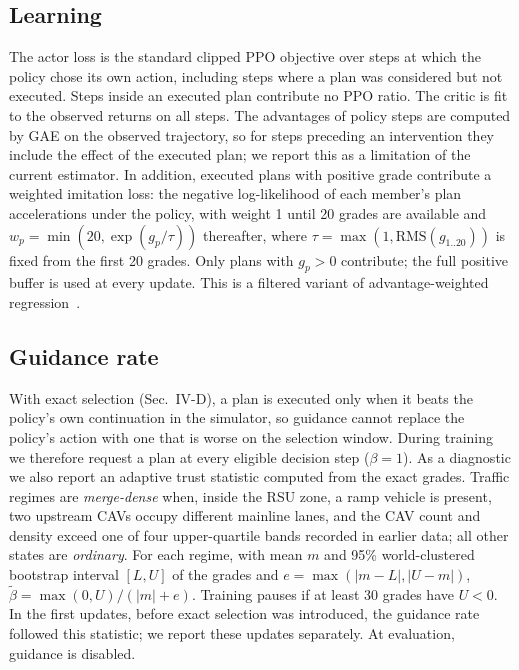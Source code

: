 \documentclass[conference]{IEEEtran}
\begin{document}
\subsection{Learning}
The actor loss is the standard clipped PPO objective over steps at which the policy chose its own action, including steps where a plan was considered but not executed. Steps inside an executed plan contribute no PPO ratio. The critic is fit to the observed returns on all steps. The advantages of policy steps are computed by GAE on the observed trajectory, so for steps preceding an intervention they include the effect of the executed plan; we report this as a limitation of the current estimator. %
In addition, executed plans with positive grade contribute a weighted imitation loss: the negative log-likelihood of each member's plan accelerations under the policy, with weight 1 until 20 grades are available and $w_p=\min(20, \exp(g_p/\tau))$ thereafter, where $\tau=\max(1, \mathrm{RMS}(g_{1..20}))$ is fixed from the first 20 grades. Only plans with $g_p>0$ contribute; the full positive buffer is used at every update. This is a filtered variant of advantage-weighted regression~\cite{peng_awr2019}. %

\subsection{Guidance rate}
With exact selection (Sec.~IV-D), a plan is executed only when it beats the policy's own continuation in the simulator, so guidance cannot replace the policy's action with one that is worse on the selection window. During training we therefore request a plan at every eligible decision step ($\beta=1$). %
As a diagnostic we also report an adaptive trust statistic computed from the exact grades. Traffic regimes are \emph{merge-dense} when, inside the RSU zone, a ramp vehicle is present, two upstream CAVs occupy different mainline lanes, and the CAV count and density exceed one of four upper-quartile bands recorded in earlier data; all other states are \emph{ordinary}. %
For each regime, with mean $m$ and 95\% world-clustered bootstrap interval $[L,U]$ of the grades and $e=\max(|m-L|,|U-m|)$, $\tilde\beta = \max(0,U)/(|m|+e)$. %
Training pauses if at least 30 grades have $U<0$. In the first updates, before exact selection was introduced, the guidance rate followed this statistic; we report these updates separately. At evaluation, guidance is disabled.
\end{document}
